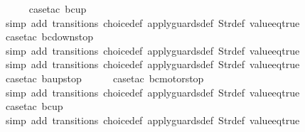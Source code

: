 \begin{isabellebody}
\ \ \ \ \isamarkupfalse%
\ {\isacharparenleft}case{\isacharunderscore}tac\ {\isachardoublequoteopen}bc{\isacharequal}up{}{}{\isachardoublequoteclose}{\isacharparenright}\isanewline
\ \ \ \ \ \isamarkupfalse%
\ {\isacharparenleft}simp\ add{\isacharcolon}\ transitions\ choice{\isacharunderscore}def\ apply{\isacharunderscore}guards{\isacharunderscore}def\ Str{\isacharunderscore}def\ value{\isacharunderscore}eq{\isacharunderscore}true{\isacharparenright}\isanewline
\ \ \ \ \isamarkupfalse%
\ {\isacharparenleft}case{\isacharunderscore}tac\ {\isachardoublequoteopen}bc{\isacharequal}down{}{}stop{\isachardoublequoteclose}{\isacharparenright}\isanewline
\ \ \ \ \ \isamarkupfalse%
\ {\isacharparenleft}simp\ add{\isacharcolon}\ transitions\ choice{\isacharunderscore}def\ apply{\isacharunderscore}guards{\isacharunderscore}def\ Str{\isacharunderscore}def\ value{\isacharunderscore}eq{\isacharunderscore}true{\isacharparenright}\isanewline
\ \ \ \ \isamarkupfalse%
\ {\isacharparenleft}simp\ add{\isacharcolon}\ transitions\ choice{\isacharunderscore}def\ apply{\isacharunderscore}guards{\isacharunderscore}def\ Str{\isacharunderscore}def\ value{\isacharunderscore}eq{\isacharunderscore}true{\isacharparenright}\isanewline
\ \ \ \isamarkupfalse%
\ {\isacharparenleft}case{\isacharunderscore}tac\ {\isachardoublequoteopen}ba{\isacharequal}up{}{}stop{\isachardoublequoteclose}{\isacharparenright}\isanewline
\ \ \ \ \isamarkupfalse%
\ {\isacharparenleft}case{\isacharunderscore}tac\ {\isachardoublequoteopen}bc{\isacharequal}motorstop{}{\isachardoublequoteclose}{\isacharparenright}\isanewline
\ \ \ \ \ \isamarkupfalse%
\ {\isacharparenleft}simp\ add{\isacharcolon}\ transitions\ choice{\isacharunderscore}def\ apply{\isacharunderscore}guards{\isacharunderscore}def\ Str{\isacharunderscore}def\ value{\isacharunderscore}eq{\isacharunderscore}true{\isacharparenright}\isanewline
\ \ \ \ \isamarkupfalse%
\ {\isacharparenleft}case{\isacharunderscore}tac\ {\isachardoublequoteopen}bc{\isacharequal}up{}{}{\isachardoublequoteclose}{\isacharparenright}\isanewline
\ \ \ \ \ \isamarkupfalse%
\ {\isacharparenleft}simp\ add{\isacharcolon}\ transitions\ choice{\isacharunderscore}def\ apply{\isacharunderscore}guards{\isacharunderscore}def\ Str{\isacharunderscore}def\ value{\isacharunderscore}eq{\isacharunderscore}true{\isacharparenright}\isanewline

\end{isabellebody}
